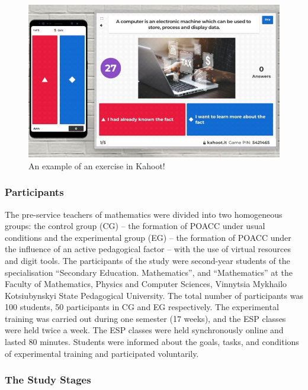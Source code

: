 \begin{figure}[htpb]
\centering
\begin{minipage}{.65\textwidth}
\caption{An example of an exercise in Kahoot!}	
\label{fig-05}
\includegraphics[width=\textwidth]{figure05}
\end{minipage}
\end{figure}

\subsubsection{Participants}\label{subsubsec-participants}

The pre-service teachers of mathematics were divided into two
homogeneous groups: the control group (CG) – the formation of POACC
under usual conditions and the experimental group (EG) – the formation
of POACC under the influence of an active pedagogical factor – with the
use of virtual resources and digit tools. The participants of the study
were second-year students of the specialisation \enquote{Secondary Education.
Mathematics}, and \enquote{Mathematics} at the Faculty of Mathematics,
Physics and Computer Sciences, Vinnytsia Mykhailo Kotsiubynskyi State
Pedagogical University. The total number of participants was 100
students, 50 participants in CG and EG respectively. The experimental
training was carried out during one semester (17 weeks), and the ESP
classes were held twice a week. The ESP classes were held synchronously
online and lasted 80 minutes. Students were informed about the goals,
tasks, and conditions of experimental training and participated
voluntarily.

\subsubsection{The Study Stages}\label{subsubsec-thestudystages}

